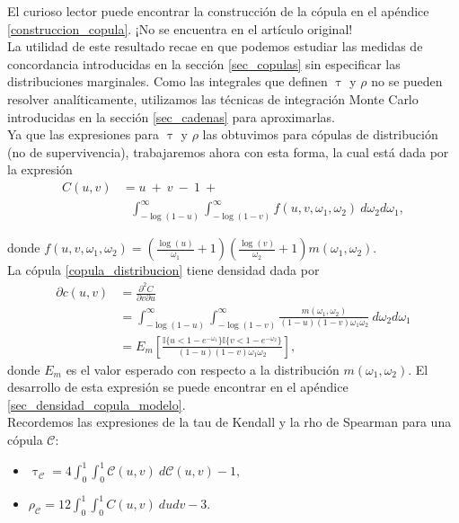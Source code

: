 \documentclass[11pt,a4paper]{article}
\newcommand{\C}{\mathcal{C}}
\begin{document}
El curioso lector puede encontrar la construcción de la cópula en el apéndice \ref{construccion_copula}. ¡No se encuentra en el artículo original!\\

La utilidad de este resultado recae en que podemos estudiar las medidas de concordancia introducidas en la sección \ref{sec_copulas} sin especificar las distribuciones marginales. Como las integrales que definen $\uptau$ y $\rho$ no se pueden resolver analíticamente, utilizamos las técnicas de integración Monte Carlo introducidas en la sección \ref{sec_cadenas} para aproximarlas.\\

Ya que las expresiones para $\uptau$ y $\rho$ las obtuvimos para cópulas de distribución (no de supervivencia), trabajaremos ahora con esta forma, la cual está dada por la expresión
\begin{align}\label{copula_distribucion}
C(u, v) &= u \ + \ v \ - \ 1 \ +\nonumber\\ 
& \ \ \ \int_{-\log (1-u)}^\infty \int_{-\log (1-v)}^\infty f(u, v, \omega_1, \omega_2) \ d\omega_2 d\omega_1,
\end{align}

donde $f(u, v, \omega_1, \omega_2) = \left( \frac{\log (u)}{\omega_1}+1 \right) \left( \frac{\log (v)}{\omega_2}+1\right) m(\omega_1, \omega_2)$.\\

La cópula \eqref{copula_distribucion} tiene densidad dada por
\begin{align}
\partial c(u, v) &= \frac{\partial^2C}{\partial v \partial u}\nonumber\\
&= \int_{-\log (1-u)}^\infty \int_{-\log (1-v)}^\infty \frac{m(\omega_1, \omega_2)}{(1-u)(1-v)\omega_1\omega_2} \ d\omega_2 d\omega_1 \nonumber\\
&= E_{m} \left[\frac{\mathbb{I}\lbrace u < 1-e^{-\omega_1}\rbrace \mathbb{I}\lbrace v < 1-e^{-\omega_2} \rbrace}{(1-u)(1-v)\omega_1\omega_2}\right],
\end{align}
donde $E_m$ es el valor esperado con respecto a la distribución $m(\omega_1, \omega_2)$. El desarrollo de esta expresión se puede encontrar en el apéndice \ref{sec_densidad_copula_modelo}.\\

Recordemos las expresiones de la tau de Kendall y la rho de Spearman para una cópula $\mathcal{C}$:
\begin{itemize}
\item $\uptau_{\mathcal{C}} = 4\int_{0}^1\int_{0}^1\C(u, v) \ d\C(u, v) - 1,$\\
\item $\rho_{\mathcal{C}} = 12\int_0^1 \int_0^1 C(u, v) \ dudv-3.$\\
\end{itemize}
\end{document}
